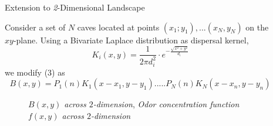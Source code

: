 \documentclass[final]{beamer}
\newlength{\sepwidth}
\newlength{\colwidth}
\newcommand{\separatorcolumn}{\begin{column}{\sepwidth}\end{column}}
\begin{document}
\begin{frame}[t]
\begin{columns}[t]
\begin{column}{\colwidth}
  
\end{column}

\separatorcolumn

\begin{column}{\colwidth}


  \begin{block}{Extension to \textit{2}-Dimensional Landscape}
  \begin{alertblock}{
 Consider a set of $N$ caves located at points $(x_1; y_1),
 ... (x_N, y_N) $ on the $xy$-plane. Using a Bivariate Laplace distribution as dispersal kernel,
 $$K_i(x,y) =
\frac{1}{2\pi d_i^2}\cdot e^{ -\frac{\sqrt{x^2 + y^2}}{d_i}}
 $$
 we modify ($3$) as
$$
     B(x,y) = P_1(n)K_1(x-x_1,y-y_1) .....P_N(n)K_N(x-x_n,y-y_n)
     $$
 
}
  \end{alertblock}

\begin{figure}
   \hfill
{}
\hfill
{}
\hfill
\caption{\textit{ $B(x, y)$ across $2$-dimension},     \textit{Odor concentration function $f(x, y)$ across $2$-dimension}}
 \end{figure}
 

\end{block}
\end{column}
\end{columns}
\end{frame}
\end{document}
